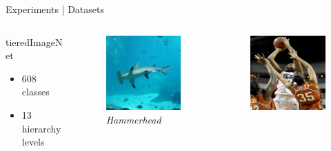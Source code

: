 \begin{frame}{Experiments | Datasets}
  \begin{columns}
    \begin{column}{0.35\textwidth}
      \alert{{\large tieredImageNet}}
      \begin{itemize}
        \item 608 classes
        \item 13 hierarchy levels
      \end{itemize}
    \end{column}
    \begin{column}{0.2\textwidth}
      \begin{figure}
        \centering
        \includegraphics[width=.7\linewidth]{figures/04/tieredImageNet/example_1.jpg}
        \captionsetup{labelformat=empty, justification=centering, font=scriptsize}
        \caption{\emph{Hammerhead}}
      \end{figure}
    \end{column}
    \begin{column}{0.2\textwidth}
      \begin{figure}
        \centering
        \includegraphics[width=.7\linewidth]{figures/04/tieredImageNet/example_2.jpg}

\end{figure}
\end{column}
\end{columns}
\end{frame}

